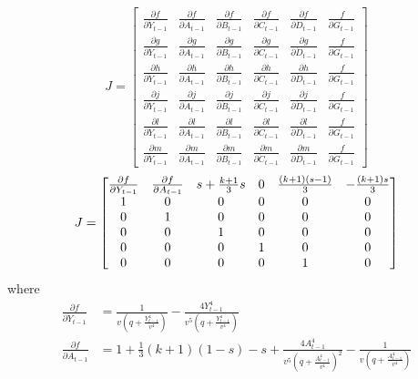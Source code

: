 \begin{equation*}
J = \begin{bmatrix}
    \frac{\partial f}{\partial \dot Y_{t-1}} & \frac{\partial f}{\partial \dot A_{t-1}} & \frac{\partial f}{\partial \dot B_{t-1}} & \frac{\partial f}{\partial \dot C_{t-1}} & \frac{\partial f}{\partial \dot D_{t-1}} & \frac{\ f}{\partial \dot G_{t-1}}\\
    \frac{\partial g}{\partial \dot Y_{t-1}} & \frac{\partial g}{\partial \dot A_{t-1}} & \frac{\partial g}{\partial \dot B_{t-1}} & \frac{\partial g}{\partial \dot C_{t-1}} & \frac{\partial g}{\partial \dot D_{t-1}} & \frac{\ f}{\partial \dot G_{t-1}}\\
    \frac{\partial h}{\partial \dot Y_{t-1}} & \frac{\partial h}{\partial \dot A_{t-1}} & \frac{\partial h}{\partial \dot B_{t-1}} & \frac{\partial h}{\partial \dot C_{t-1}} & \frac{\partial h}{\partial \dot D_{t-1}} & \frac{\ f}{\partial \dot G_{t-1}}\\
    \frac{\partial j}{\partial \dot Y_{t-1}} & \frac{\partial j}{\partial \dot A_{t-1}} & \frac{\partial j}{\partial \dot B_{t-1}} & \frac{\partial j}{\partial \dot C_{t-1}} & \frac{\partial j}{\partial \dot D_{t-1}} & \frac{\ f}{\partial \dot G_{t-1}}\\
    \frac{\partial l}{\partial \dot Y_{t-1}} & \frac{\partial l}{\partial \dot A_{t-1}} & \frac{\partial l}{\partial \dot B_{t-1}} & \frac{\partial l}{\partial \dot C_{t-1}} & \frac{\partial l}{\partial \dot D_{t-1}} & \frac{\ f}{\partial \dot G_{t-1}}\\
    \frac{\partial m}{\partial \dot Y_{t-1}} & \frac{\partial m}{\partial \dot A_{t-1}} & \frac{\partial m}{\partial \dot B_{t-1}} & \frac{\partial m}{\partial \dot C_{t-1}} & \frac{\partial m}{\partial \dot D_{t-1}} & \frac{\ f}{\partial \dot G_{t-1}}
\end{bmatrix}
\end{equation*}
\begin{equation}
J=
\begin{bmatrix}\small
    \frac{\partial f}{\partial Y_{t-1}} & \frac{\partial f}{\partial A_{t-1}} & s+\frac{k+1}{3}s & 0 & \frac{(k+1)(s-1)}{3} & -\frac{(k+1)s}{3}\\
    1 & 0 & 0 & 0 & 0 & 0\\
    0 & 1 & 0 & 0 & 0 & 0\\
    0 & 0 & 1 & 0 & 0 & 0\\
    0 & 0 & 0 & 1 & 0 & 0\\
    0 & 0 & 0 & 0 & 1 & 0
\end{bmatrix}
\end{equation}
where 
\begin{align*}
    \frac{\partial f}{\partial \dot Y_{t-1}}&= \frac{1}{v\left(q+\frac{Y_{t-1}^4}{v^4}\right)}-\frac{4Y_{t-1}^4}{v^5\left(q+\frac{Y_{t-1}^4}{v^4}\right)}\\
    \frac{\partial f}{\partial \dot A_{t-1}}&=1+\frac{1}{3}(k+1)(1-s)-s+\frac{4A_{t-1}^4}{v^5\left(q+\frac{A_{t-1}^4}{v^4}\right)^2}-\frac{1}{v\left(q+\frac{A_{t-1}^4}{v^4}\right)}
\end{align*}

